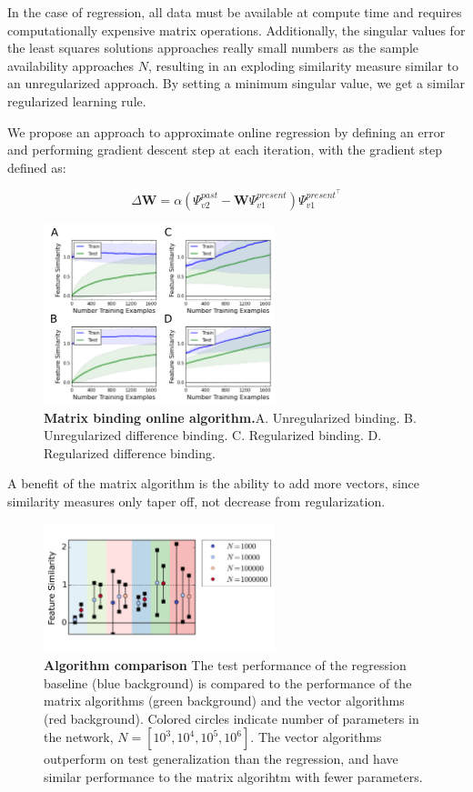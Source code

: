 \documentclass{article}
\begin{document}
In the case of regression, all data must be available at compute time and requires computationally expensive matrix operations. Additionally, the singular values for the least squares solutions approaches really small numbers as the sample availability approaches $N$, resulting in an exploding similarity measure similar to an unregularized approach. By setting a minimum singular value, we get a similar regularized learning rule. 

We propose an approach to approximate online regression by defining an error and performing gradient descent step at each iteration, with the gradient step defined as:

\begin{equation}
\Delta \mathbf{W} = \alpha (\Psi^{past}_{v2} - \mathbf{W} \Psi^{present}_{v1}) \Psi^{present^\top}_{v1}
\end{equation}


\begin{figure}[h]
\centering
\includegraphics[width=0.6\textwidth]{outer_product_algorithm-170518.png}
\caption{\textbf{Matrix binding online algorithm.}A. Unregularized binding. B. Unregularized difference binding. C. Regularized binding. D. Regularized difference binding.}
\end{figure}

A benefit of the matrix algorithm is the ability to add more vectors, since similarity measures only taper off, not decrease from regularization.

\begin{figure}[h]
\centering
\includegraphics[width=0.6\textwidth]{algorithm_comparison-170519.png}
\caption{\textbf{Algorithm comparison} The test performance of the regression baseline (blue background) is compared to the performance of the matrix algorithms (green background) and the vector algorithms (red background). Colored circles indicate number of parameters in the network, $N=[10^3, 10^4, 10^5, 10^6]$. The vector algorithms outperform on test generalization than the regression, and have similar performance to the matrix algorihtm with fewer parameters.}
\end{figure}
\end{document}
